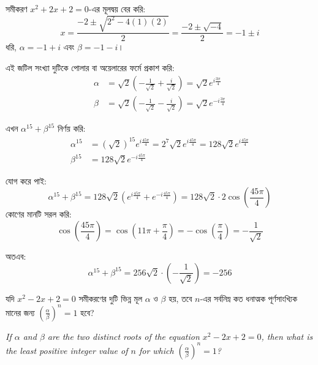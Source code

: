 \documentclass[12pt, a4paper]{article}
\begin{document}
\begin{tcolorbox}[solutionbox={সমাধান (Solution)}]
    \noindent
    সমীকরণ $x^2 + 2x + 2 = 0$-এর মূলদ্বয় বের করি:
    \[ x = \frac{-2 \pm \sqrt{2^2 - 4(1)(2)}}{2} = \frac{-2 \pm \sqrt{-4}}{2} = -1 \pm i \]
    ধরি, $\alpha = -1+i$ এবং $\beta = -1-i$। 
    
    \vspace{0.5em}
    এই জটিল সংখ্যা দুটিকে পোলার বা অয়েলারের ফর্মে প্রকাশ করি:
    \begin{align*}
        \alpha &= \sqrt{2}\left(-\frac{1}{\sqrt{2}} + \frac{i}{\sqrt{2}}\right) = \sqrt{2} e^{i \frac{3\pi}{4}} \\
        \beta &= \sqrt{2}\left(-\frac{1}{\sqrt{2}} - \frac{i}{\sqrt{2}}\right) = \sqrt{2} e^{-i \frac{3\pi}{4}}
    \end{align*}
    
    \vspace{0.5em}
    এখন $\alpha^{15} + \beta^{15}$ নির্ণয় করি:
    \begin{align*}
        \alpha^{15} &= (\sqrt{2})^{15} e^{i \frac{45\pi}{4}} = 2^{7} \sqrt{2} e^{i \frac{45\pi}{4}} = 128\sqrt{2} e^{i \frac{45\pi}{4}} \\
        \beta^{15} &= 128\sqrt{2} e^{-i \frac{45\pi}{4}}
    \end{align*}
    
    \vspace{0.5em}
    যোগ করে পাই:
    \[ \alpha^{15} + \beta^{15} = 128\sqrt{2} \left( e^{i \frac{45\pi}{4}} + e^{-i \frac{45\pi}{4}} \right) = 128\sqrt{2} \cdot 2\cos\left(\frac{45\pi}{4}\right) \]
    কোণের মানটি সরল করি:
    \[ \cos\left(\frac{45\pi}{4}\right) = \cos\left(11\pi + \frac{\pi}{4}\right) = -\cos\left(\frac{\pi}{4}\right) = -\frac{1}{\sqrt{2}} \]
    
    \vspace{0.5em}
    অতএব:
    \[ \alpha^{15} + \beta^{15} = 256\sqrt{2} \cdot \left(-\frac{1}{\sqrt{2}}\right) = -256 \]
\end{tcolorbox}
\begin{tcolorbox}[questionbox={প্রশ্ন (Question) 32}]
    \noindent
    যদি $x^2 - 2x + 2 = 0$ সমীকরণের দুটি ভিন্ন মূল $\alpha$ ও $\beta$ হয়, তবে $n$-এর সর্বনিম্ন কত ধনাত্মক পূর্ণসাংখ্যিক মানের জন্য $\left(\frac{\alpha}{\beta}\right)^n = 1$ হবে?
    
    \vspace{0.8em}
    \begin{english}
    \noindent\textit{\color{darkgray}
    If $\alpha$ and $\beta$ are the two distinct roots of the equation $x^2 - 2x + 2 = 0$, then what is the least positive integer value of $n$ for which $\left(\frac{\alpha}{\beta}\right)^n = 1$?
    }
    \end{english}
\end{tcolorbox}
\end{document}
